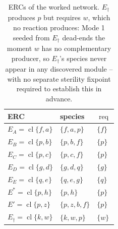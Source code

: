 \documentclass[11pt]{article}
\theoremstyle{plain}
\theoremstyle{remark}
\newcommand{\cl}{\operatorname{cl}}
\newcommand{\req}{\operatorname{req}}
\begin{document}
\begin{table}[t]
\centering\small
\begin{tabular}{lll}
\toprule
ERC & species & $\req$ \\
\midrule
$E_A=\cl\{f,a\}$ & $\{f,a,p\}$ & $\{f\}$\\
$E_B=\cl\{p,b\}$ & $\{p,b,f\}$ & $\{p\}$\\
$E_C=\cl\{p,c\}$ & $\{p,c,f\}$ & $\{p\}$\\
$E_D=\cl\{g,d\}$ & $\{g,d,q\}$ & $\{g\}$\\
$E_E=\cl\{q,e\}$ & $\{q,e,g\}$ & $\{q\}$\\
$E^{*}=\cl\{p,h\}$ & $\{p,h\}$ & $\{p\}$\\
$E'=\cl\{p,z\}$ & $\{p,z,b,f\}$ & $\{p\}$\\
$E_{\dagger}=\cl\{k,w\}$ & $\{k,w,p\}$ & $\{w\}$\\
\bottomrule
\end{tabular}
\caption{ERCs of the worked network. $E_\dagger$ produces $p$ but requires
$w$, which no reaction produces: Mode 1 seeded from $E_\dagger$ dead-ends
the moment $w$ has no complementary producer, so $E_\dagger$'s species
never appear in any discovered module -- with no separate sterility
fixpoint required to establish this in advance.}
\label{tab:worked}
\end{table}
\end{document}
